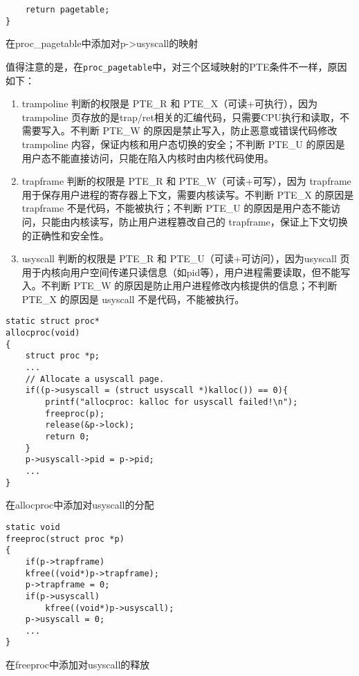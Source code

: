 {\begin{listing}[!htb]
\begin{verbatim}
    return pagetable;
}
	\end{verbatim}
	\caption{在proc\_pagetable中添加对p->usyscall的映射}\label{lst:proc_pagetable}
\end{listing}

值得注意的是，在\texttt{proc\_pagetable}中，对三个区域映射的PTE条件不一样，原因如下：
\begin{enumerate}
	\item trampoline 判断的权限是 PTE\_R 和 PTE\_X（可读+可执行），因为 trampoline 页存放的是trap/ret相关的汇编代码，只需要CPU执行和读取，不需要写入。不判断 PTE\_W 的原因是禁止写入，防止恶意或错误代码修改 trampoline 内容，保证内核和用户态切换的安全；不判断 PTE\_U 的原因是用户态不能直接访问，只能在陷入内核时由内核代码使用。
	
	\item trapframe 判断的权限是 PTE\_R 和 PTE\_W（可读+可写），因为 trapframe 用于保存用户进程的寄存器上下文，需要内核读写。不判断 PTE\_X 的原因是 trapframe 不是代码，不能被执行；不判断 PTE\_U 的原因是用户态不能访问，只能由内核读写，防止用户进程篡改自己的 trapframe，保证上下文切换的正确性和安全性。
	
	\item usyscall 判断的权限是 PTE\_R 和 PTE\_U（可读+可访问），因为usyscall 页用于内核向用户空间传递只读信息（如pid等），用户进程需要读取，但不能写入。不判断 PTE\_W 的原因是防止用户进程修改内核提供的信息；不判断 PTE\_X 的原因是 usyscall 不是代码，不能被执行。
	
\end{enumerate}

\begin{listing}[!htb]
	\begin{verbatim}
static struct proc*
allocproc(void)
{
    struct proc *p;
    ...
    // Allocate a usyscall page.
    if((p->usyscall = (struct usyscall *)kalloc()) == 0){
        printf("allocproc: kalloc for usyscall failed!\n");
        freeproc(p);
        release(&p->lock);
        return 0;
    }
    p->usyscall->pid = p->pid;
    ...
}
	\end{verbatim}
	\caption{在allocproc中添加对usyscall的分配}\label{lst:allocproc}
\end{listing}

\begin{listing}[!htb]
	\begin{verbatim}
static void
freeproc(struct proc *p)
{
    if(p->trapframe)
    kfree((void*)p->trapframe);
    p->trapframe = 0;
    if(p->usyscall)
        kfree((void*)p->usyscall);
    p->usyscall = 0;
    ...
}
	\end{verbatim}
	\caption{在freeproc中添加对usyscall的释放}\label{lst:freeproc}
\end{listing}

}
